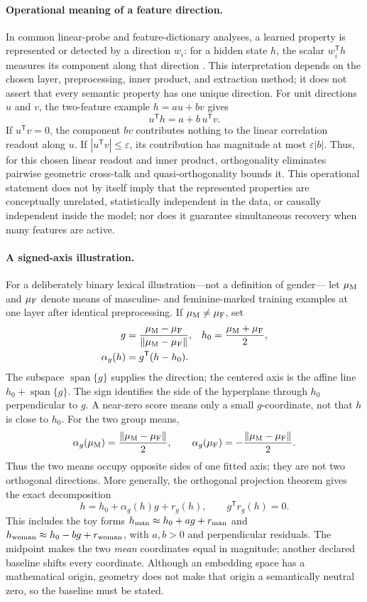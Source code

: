 \documentclass[
  aps,
  reprint,
  superscriptaddress,
  floatfix,
  nofootinbib,
  longbibliography
]{revtex4-2}
\newcommand{\T}{^{\mathsf{T}}}
\newcommand{\norm}[1]{\lVert #1 \rVert}
\DeclareMathOperator{\spanop}{span}
\begin{document}
\paragraph{Operational meaning of a feature direction.}
In common linear-probe and feature-dictionary analyses, a learned property is
represented or detected by a direction $w_i$: for a hidden state $h$, the
scalar $w_i\T h$ measures its component along that direction
\cite{elhage2022superposition,bricken2023monosemanticity,li2025geometry}.
This interpretation depends on the chosen layer, preprocessing, inner product,
and extraction method; it does not assert that every semantic property has one
unique direction.  For unit directions $u$ and $v$, the two-feature example
$h=a u+b v$ gives
\[
u\T h=a+b\,u\T v.
\]
If $u\T v=0$, the component $b v$ contributes nothing to the linear
correlation readout along $u$.  If $|u\T v|\leq\varepsilon$, its contribution
has magnitude at most $\varepsilon|b|$.  Thus, for this chosen linear readout
and inner product, orthogonality eliminates pairwise geometric cross-talk and
quasi-orthogonality bounds it.  This operational statement does not by itself
imply that the represented properties are conceptually unrelated, statistically
independent in the data, or causally independent inside the model; nor does it
guarantee simultaneous recovery when many features are active.

\paragraph{A signed-axis illustration.}
For a deliberately binary lexical illustration---not a definition of gender---
let $\mu_{\rm M}$ and $\mu_{\rm F}$ denote means of masculine- and
feminine-marked training examples at one layer after identical preprocessing.
If $\mu_{\rm M}\ne\mu_{\rm F}$, set
\begin{align*}
g&=\frac{\mu_{\rm M}-\mu_{\rm F}}
        {\norm{\mu_{\rm M}-\mu_{\rm F}}},
&
h_0&=\frac{\mu_{\rm M}+\mu_{\rm F}}{2},\\
\alpha_g(h)&=g\T(h-h_0).
\end{align*}
The subspace $\spanop\{g\}$ supplies the direction; the centered axis is the
affine line $h_0+\spanop\{g\}$.  The sign identifies the side of the hyperplane
through $h_0$ perpendicular to $g$.  A near-zero score means only a small
$g$-coordinate, not that $h$ is close to $h_0$.  For the two group means,
\[
\alpha_g(\mu_{\rm M})=\frac{\norm{\mu_{\rm M}-\mu_{\rm F}}}{2},
\qquad
\alpha_g(\mu_{\rm F})=-\frac{\norm{\mu_{\rm M}-\mu_{\rm F}}}{2}.
\]
Thus the two means occupy opposite sides of one fitted axis; they are not two
orthogonal directions.  More generally, the orthogonal projection theorem
gives the exact decomposition
\[
h=h_0+\alpha_g(h)g+r_g(h),
\qquad g\T r_g(h)=0.
\]
This includes the toy forms $h_{\rm man}\approx h_0+a g+r_{\rm man}$ and
$h_{\rm woman}\approx h_0-b g+r_{\rm woman}$, with $a,b>0$ and perpendicular
residuals.  The midpoint makes the two \emph{mean} coordinates equal in
magnitude; another declared baseline shifts every coordinate.  Although an
embedding space has a mathematical origin, geometry does not make that origin
a semantically neutral zero, so the baseline must be stated.
\end{document}
